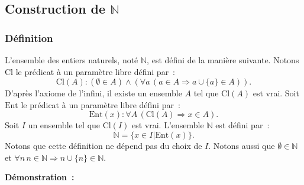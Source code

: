 \subsection{Construction de \texorpdfstring{$\mathbb{N}$}{N}}
\label{sub:constN}

\subsubsection{Définition}

L'ensemble des entiers naturels, noté $\mathbb{N}$, est défini de la manière suivante. 
Notons $\mathrm{Cl}$ le prédicat à un paramètre libre défini par :
\begin{equation*}
    \mathrm{Cl}(A): (\emptyset \in A) \wedge (\forall a \, (a \in A \Rightarrow a \cup \lbrace a \rbrace \in A)). 
\end{equation*}
D'après l'axiome de l'infini, il existe un ensemble $A$ tel que $\mathrm{Cl}(A)$ est vrai.
Soit $\mathrm{Ent}$ le prédicat à un paramètre libre défini par : 
\begin{equation*}
    \mathrm{Ent}(x): \forall A \, (\mathrm{Cl}(A) \Rightarrow x \in A). 
\end{equation*}
Soit $I$ un ensemble tel que $\mathrm{Cl}(I)$ est vrai. 
L'ensemble $\mathbb{N}$ est défini par : 
\begin{equation*}
     \mathbb{N} = \lbrace x \in I \vert \mathrm{Ent}(x) \rbrace. 
\end{equation*}
Notons que cette définition ne dépend pas du choix de $I$. 
Notons aussi que $\emptyset \in \mathbb{N}$ et $\forall n \, n \in \mathbb{N} \Rightarrow n \cup \lbrace n \rbrace \in \mathbb{N}$.

\medskip

\noindent\textbf{Démonstration :}

